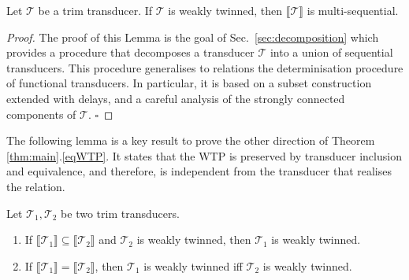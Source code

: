 \documentclass[envcountsame]{llncs}
\newcommand\inter[1]{\llbracket #1 \rrbracket}
\newcommand\tra{\mathcal{T}}
\newcommand\eof{\hfill$\square$}
\begin{document}
\begin{lemma}\label{lem:decomposition}
    Let $\tra$ be a trim transducer. If $\tra$ is weakly twinned, then
    $\inter{\tra}$ is multi-sequential.
\end{lemma}

\begin{proof}
The proof of this Lemma is the goal of Sec.~\ref{sec:decomposition}
which provides a procedure that decomposes a transducer $\tra$ into a
union of sequential transducers. This procedure generalises to
relations the determinisation procedure of functional transducers. In
particular, it is based on a subset construction extended with delays, 
and a careful analysis of the strongly connected components of
$\tra$. \eof
\end{proof}


The following lemma is a key result to prove the other direction of
Theorem \ref{thm:main}.\ref{eqWTP}. It states that the WTP is
preserved by transducer inclusion and
equivalence, and therefore, is independent from the transducer that
realises the relation. 

\begin{lemma}\label{lem:preserve}
    Let $\tra_1,\tra_2$ be two trim transducers. 
\vspace{-1mm}
    \begin{enumerate}
        \item If $\inter{\tra_1} \subseteq \inter{\tra_2}$ and $\tra_2$
          is weakly twinned, then $\tra_1$ is weakly twinned. 
        \item If $\inter{\tra_1}=\inter{\tra_2}$, then $\tra_1$ is
          weakly twinned iff $\tra_2$ is weakly twinned.
    \end{enumerate}
\end{lemma}
\end{document}
